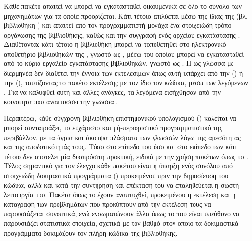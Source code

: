 \subsubsection{}
Κάθε πακέτο  απαιτεί να μπορεί να εγκατασταθεί οικουμενικά σε όλο το σύνολο των μηχανημάτων για τα οποία προορίζεται.
Κάτι τέτοιο επιλύεται μέσω της ίδιας της  (βλ. βιβλιοθήκη \href{https://pypi.org/project/setuptools/}{}) και απαιτεί από τον προγραμματιστή μονάχα ένα στοιχειώδη τρόπο οργάνωσης της βιβλιοθήκης, καθώς και την συγγραφή ενός αρχείου εγκατάστασης .
Διαθέτοντας κάτι τέτοιο η βιβλιοθήκη μπορεί να τοποθετηθεί στο ηλεκτρονικό αποθετήριο βιβλιοθηκών της , γνωστό ως , μέσω του οποίου μπορεί να εγκατασταθεί από το κύριο εργαλείο εγκατάστασης βιβλιοθηκών, γνωστό ως \href{https://pypi.org/project/pip/}{}.
Η  ως γλώσσα με διερμηνέα δεν διαθέτει την έννοια των εκτελεσίμων όπως αυτή υπάρχει από την  () ή την  (), ταυτίζοντας το πακέτο εκτέλεσης με τον ίδιο τον κώδικα, μέσω των λεγόμενων .
Για να καλυφθεί αυτή και άλλες ανάγκες, τα λεγόμενα \href{https://pythonwheels.com/}{} εισήχθησαν από την κοινότητα που αναπτύσσει την γλώσσα .\par
Περαιτέρω, κάθε σύγχρονη βιβλιοθήκη επιστημονικού υπολογισμού () καλείται να μπορεί συνταιριάξει, το ευχάριστο και μή-περιοριστικό προγραμματιστικό της περιβάλλον, με τα άγρια και άκομψα πλάσματα των γλωσσών  λόγω της αμεσότητας και της αποδοτικότητάς τους.
Τόσο στο επίπεδο του  όσο και στο επίπεδο των  κάτι τέτοιο δεν αποτελεί μία δυσπρόσιτη πρακτική, ειδικά με την χρήση πακέτων όπως το \href{https://pypi.org/project/Cython/}{}.
Τέλος σημαντικό για τον έλεγχο κάθε πακέτου είναι η ύπαρξη ενός συνόλου από στοιχειώδη δοκιμαστικά προγράμματα () προκειμένου πριν την δημοσίευση του κώδικα, αλλά και κατά την συντήρηση και επέκταση του να επαληθεύεται η σωστή λειτουργία του.
Πακέτα όπως το \href{https://pypi.org/project/nose/}{} έχουν αναπτυχθεί, προκειμένου η εκτέλεση και η καταγραφή των προβλημάτων που προκύπτουν από την εκτέλεση τους να παρουσιάζεται συνοπτικά, ενώ ενσωματώνουν άλλα όπως το \href{https://pypi.org/project/coverage/}{} που είναι υπεύθυνο να παρουσιάζει στατιστικά στοιχεία, σχετικά με τον βαθμό στον οποίο τα δοκιμαστικά προγράμματα δοκιμάζουν τον πλήρη κώδικα της βιβλιοθήκης.


